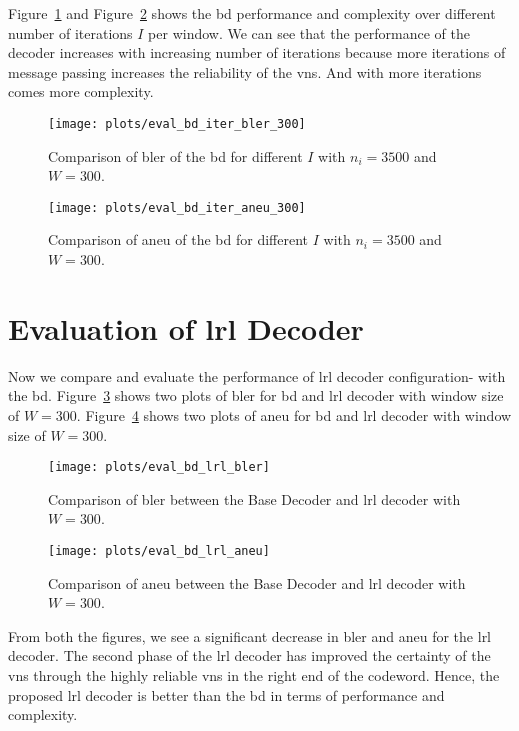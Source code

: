Figure~\ref{fig:eval_bd_iter_bler_300} and Figure~\ref{fig:eval_bd_iter_aneu_300} shows the \gls{bd} performance and complexity over different number of iterations $I$ per window. We can see that the performance of the decoder increases with increasing number of iterations because more iterations of message passing increases the reliability of the \glspl{vn}. And with more iterations comes more complexity.
\begin{figure}[htbp]
  \centering
  \texttt{[image: plots/eval\_bd\_iter\_bler\_300]}
  \caption{Comparison of \gls{bler} of the \acrfull{bd} for different $I$ with $n_i=3500$ and $W=300$.}
  \label{fig:eval_bd_iter_bler_300}
\end{figure}
\begin{figure}[htbp]
  \centering
  \texttt{[image: plots/eval\_bd\_iter\_aneu\_300]}
  \caption{Comparison of \gls{aneu} of the \acrfull{bd} for different $I$ with $n_i=3500$ and $W=300$.}
  \label{fig:eval_bd_iter_aneu_300}
\end{figure}

\section{Evaluation of \acrfull{lrl} Decoder}
Now we compare and evaluate the performance of \gls{lrl} decoder configuration- with the \gls{bd}. Figure~\ref{fig:eval_bd_lrl_bler} shows two plots of \gls{bler} for \gls{bd} and \gls{lrl} decoder with window size of $W=300$. Figure~\ref{fig:eval_bd_lrl_aneu} shows two plots of \gls{aneu} for \gls{bd} and \gls{lrl} decoder with window size of $W=300$.
\begin{figure}[htbp]
  \centering
  \texttt{[image: plots/eval\_bd\_lrl\_bler]}
  \caption{Comparison of \gls{bler} between the Base Decoder and \gls{lrl} decoder with $W=300$.}
  \label{fig:eval_bd_lrl_bler}
\end{figure}
\begin{figure}[htbp]
  \centering
  \texttt{[image: plots/eval\_bd\_lrl\_aneu]}
  \caption{Comparison of \gls{aneu} between the Base Decoder and \gls{lrl} decoder with $W=300$.}
  \label{fig:eval_bd_lrl_aneu}
\end{figure}

From both the figures, we see a significant decrease in \gls{bler} and \gls{aneu} for the \gls{lrl} decoder. The second phase of the \gls{lrl} decoder has improved the certainty of the \glspl{vn} through the highly reliable \glspl{vn} in the right end of the codeword. Hence, the proposed \gls{lrl} decoder is better than the \gls{bd} in terms of performance and complexity.


